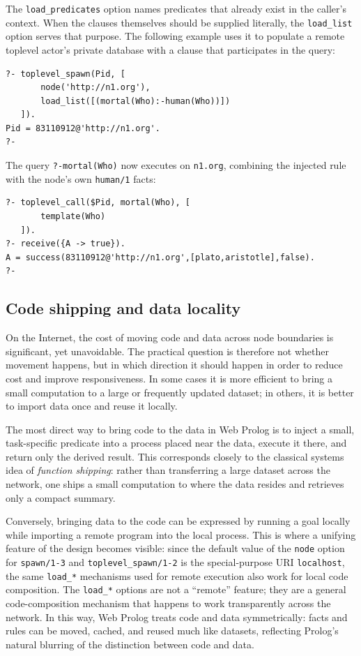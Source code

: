 \noindent The \texttt{load\_predicates} option names predicates that
already exist in the caller's context. When the clauses themselves
should be supplied literally, the \texttt{load\_list} option serves
that purpose. The following example uses it to populate a remote
toplevel actor's private database with a clause that participates in
the query:

\begin{verbatim}
?- toplevel_spawn(Pid, [
       node('http://n1.org'),
       load_list([(mortal(Who):-human(Who))])
   ]).
Pid = 83110912@'http://n1.org'.
?-   
\end{verbatim}

\noindent The query \texttt{?-mortal(Who)} now executes on
\texttt{n1.org}, combining the injected rule with the node's own
\texttt{human/1} facts:

\begin{verbatim}
?- toplevel_call($Pid, mortal(Who), [
       template(Who)
   ]).
?- receive({A -> true}).
A = success(83110912@'http://n1.org',[plato,aristotle],false).
?-
\end{verbatim}


\subsection{Code shipping and data locality}
\label{sec:code-shipping}

On the Internet, the cost of moving code and data across node
boundaries is significant, yet unavoidable. The practical question
is therefore not whether movement happens, but in which direction it
should happen in order to reduce cost and improve responsiveness. In
some cases it is more efficient to bring a small computation to a
large or frequently updated dataset; in others, it is better to
import data once and reuse it locally.

The most direct way to bring code to the data in Web Prolog is to
inject a small, task-specific predicate into a process placed near
the data, execute it there, and return only the derived result. This
corresponds closely to the classical systems idea of \textit{function
shipping}: rather than transferring a large dataset across the
network, one ships a small computation to where the data resides and
retrieves only a compact summary.

Conversely, bringing data to the code can be expressed by running a
goal locally while importing a remote program into the local
process. This is where a unifying feature of the design becomes
visible: since the default value of the \texttt{node} option for
\texttt{spawn/1-3} and \texttt{toplevel\_spawn/1-2} is the
special-purpose URI \texttt{localhost}, the same \texttt{load\_*}
mechanisms used for remote execution also work for local code
composition. The \texttt{load\_*} options are not a ``remote''
feature; they are a general code-composition mechanism that happens
to work transparently across the network. In this way, Web Prolog
treats code and data symmetrically: facts and rules can be moved,
cached, and reused much like datasets, reflecting Prolog's natural
blurring of the distinction between code and data.

